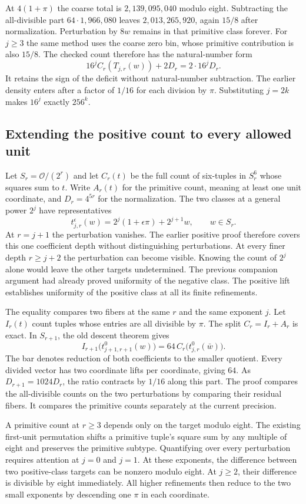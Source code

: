 \documentclass[12pt,letterpaper]{article}
\begin{document}
At $4(1+\pi)$ the coarse total is $2{,}139{,}095{,}040$ modulo eight. Subtracting the all-divisible part $64\cdot1{,}966{,}080$ leaves $2{,}013{,}265{,}920$, again $15/8$ after normalization. Perturbation by $8w$ remains in that primitive class forever. For $j\geq3$ the same method uses the coarse zero bin, whose primitive contribution is also $15/8$. The checked count therefore has the natural-number form
\[
 16^j C_r(T_{j,r}(w))+2D_r=2\cdot16^j D_r .
\]
It retains the sign of the deficit without natural-number subtraction. The earlier density enters after a factor of $1/16$ for each division by $\pi$. Substituting $j=2k$ makes $16^j$ exactly $256^k$.

\subsection{Extending the positive count to every allowed unit}
Let $S_r=\mathcal O/(2^r)$ and let $C_r(t)$ be the full count of six-tuples in $S_r^6$ whose squares sum to $t$. Write $A_r(t)$ for the primitive count, meaning at least one unit coordinate, and $D_r=4^{5r}$ for the normalization. The two classes at a general power $2^j$ have representatives
\[
t_{j,r}^{\epsilon}(w)=2^j(1+\epsilon\pi)+2^{j+1}w,\qquad w\in S_r.
\]
At $r=j+1$ the perturbation vanishes. The earlier positive proof therefore covers this one coefficient depth without distinguishing perturbations. At every finer depth $r\geq j+2$ the perturbation can become visible. Knowing the count of $2^j$ alone would leave the other targets undetermined. The previous companion argument had already proved uniformity of the negative class. The positive lift establishes uniformity of the positive class at all its finite refinements.

The equality compares two fibers at the same $r$ and the same exponent $j$. Let $I_r(t)$ count tuples whose entries are all divisible by $\pi$. The split $C_r=I_r+A_r$ is exact. In $S_{r+1}$, the old descent theorem gives
\[
 I_{r+1}\bigl(t_{j+1,r+1}^0(w)\bigr)
 = 64\,C_r\bigl(t_{j,r}^0(\bar w)\bigr).
\]
The bar denotes reduction of both coefficients to the smaller quotient. Every divided vector has two coordinate lifts per coordinate, giving $64$. As $D_{r+1}=1024D_r$, the ratio contracts by $1/16$ along this part. The proof compares the all-divisible counts on the two perturbations by comparing their residual fibers. It compares the primitive counts separately at the current precision.

A primitive count at $r\geq3$ depends only on the target modulo eight. The existing first-unit permutation shifts a primitive tuple's square sum by any multiple of eight and preserves the primitive subtype. Quantifying over every perturbation requires attention at $j=0$ and $j=1$. At these exponents, the difference between two positive-class targets can be nonzero modulo eight. At $j\geq2$, their difference is divisible by eight immediately. All higher refinements then reduce to the two small exponents by descending one $\pi$ in each coordinate.
\end{document}
